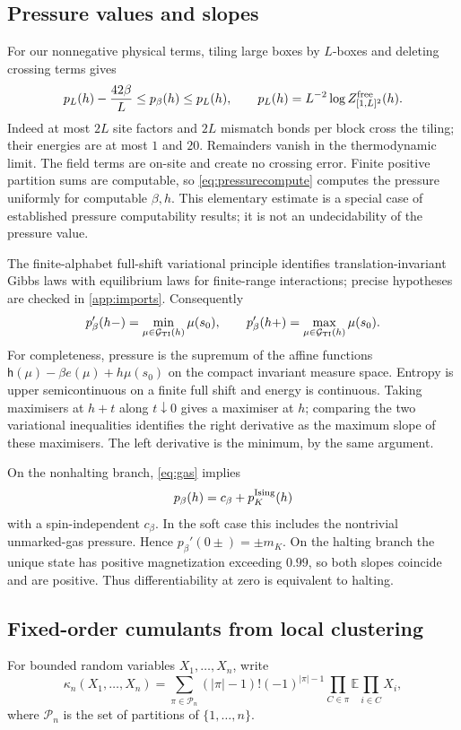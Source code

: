 \documentclass[11pt,reqno]{amsart}
\numberwithin{equation}{section}
\theoremstyle{definition}
\theoremstyle{remark}
\newcommand{\E}{\mathbb E}
\newcommand{\Gibbs}{\mathcal G}
\begin{document}
\subsection{Pressure values and slopes}
For our nonnegative physical terms, tiling large boxes by $L$-boxes and deleting crossing terms gives
\begin{equation}\label{eq:pressurecompute}
 p_L(h)-\frac{42\beta}{L}\leq p_\beta(h)\leq p_L(h),\qquad
 p_L(h)=L^{-2}\log Z_{[1,L]^2}^{\rm free}(h).
\end{equation}
Indeed at most $2L$ site factors and $2L$ mismatch bonds per block cross the tiling; their energies are at most $1$ and $20$. Remainders vanish in the thermodynamic limit. The field terms are on-site and create no crossing error. Finite positive partition sums are computable, so \eqref{eq:pressurecompute} computes the pressure uniformly for computable $\beta,h$. This elementary estimate is a special case of established pressure computability results; it is not an undecidability of the pressure value.

The finite-alphabet full-shift variational principle identifies translation-invariant Gibbs laws with equilibrium laws for finite-range interactions; precise hypotheses are checked in \cref{app:imports}. Consequently
\begin{equation}\label{eq:slopes}
 p_\beta'(h-)=\min_{\mu\in\Gibbs_{\rm TI}(h)}\mu(s_0),\qquad
 p_\beta'(h+)=\max_{\mu\in\Gibbs_{\rm TI}(h)}\mu(s_0).
\end{equation}
For completeness, pressure is the supremum of the affine functions
$\mathsf h(\mu)-\beta e(\mu)+h\mu(s_0)$ on the compact invariant measure space. Entropy is upper semicontinuous on a finite full shift and energy is continuous. Taking maximisers at $h+t$ along $t\downarrow0$ gives a maximiser at $h$; comparing the two variational inequalities identifies the right derivative as the maximum slope of these maximisers. The left derivative is the minimum, by the same argument.

On the nonhalting branch, \eqref{eq:gas} implies
\[
 p_\beta(h)=c_\beta+p^{\rm Ising}_K(h)
\]
with a spin-independent $c_\beta$. In the soft case this includes the nontrivial unmarked-gas pressure. Hence $p_\beta'(0\pm)=\pm m_K$. On the halting branch the unique state has positive magnetization exceeding $0.99$, so both slopes coincide and are positive. Thus differentiability at zero is equivalent to halting.

\subsection{Fixed-order cumulants from local clustering}
For bounded random variables $X_1,\ldots,X_n$, write
\[
 \kappa_n(X_1,\ldots,X_n)=
 \sum_{\pi\in\mathcal P_n}(|\pi|-1)!(-1)^{|\pi|-1}
 \prod_{C\in\pi}\E\prod_{i\in C}X_i,
\]
where $\mathcal P_n$ is the set of partitions of $\{1,\ldots,n\}$.
\end{document}
